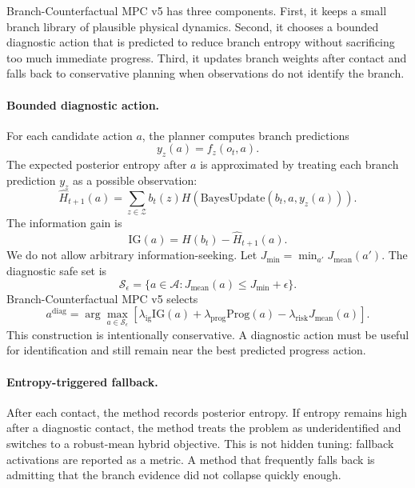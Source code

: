 \documentclass{article}
\newcommand{\methodv}{Branch-Counterfactual MPC v5}
\newcommand{\latent}{z}
\newcommand{\obs}{o}
\newcommand{\act}{a}
\newcommand{\branchset}{\mathcal{Z}}
\newcommand{\actionset}{\mathcal{A}}
\begin{document}
\methodv{} has three components.  First, it keeps a small branch library of plausible physical dynamics.  Second, it chooses a bounded diagnostic action that is predicted to reduce branch entropy without sacrificing too much immediate progress.  Third, it updates branch weights after contact and falls back to conservative planning when observations do not identify the branch.

\paragraph{Bounded diagnostic action.}
For each candidate action $\act$, the planner computes branch predictions
\[
  y_{\latent}(\act) = f_{\latent}(\obs_t,\act).
\]
The expected posterior entropy after $\act$ is approximated by treating each branch prediction $y_{\latent}$ as a possible observation:
\[
  \widehat{H}_{t+1}(\act)
  =
  \sum_{\latent \in \branchset} b_t(\latent)
  H\left(
  \mathrm{BayesUpdate}(b_t,\act,y_{\latent}(\act))
  \right).
\]
The information gain is
\[
  \mathrm{IG}(\act) = H(b_t)-\widehat{H}_{t+1}(\act).
\]
We do not allow arbitrary information-seeking.  Let $J_{\min}=\min_{\act'}J_{\mathrm{mean}}(\act')$.  The diagnostic safe set is
\[
  \mathcal{S}_{\epsilon}
  =
  \{\act \in \actionset: J_{\mathrm{mean}}(\act) \le J_{\min}+\epsilon\}.
\]
\methodv{} selects
\[
  \act^{\mathrm{diag}}
  =
  \arg\max_{\act \in \mathcal{S}_{\epsilon}}
  \left[
    \lambda_{\mathrm{ig}}\mathrm{IG}(\act)
    +\lambda_{\mathrm{prog}}\mathrm{Prog}(\act)
    -\lambda_{\mathrm{risk}}J_{\mathrm{mean}}(\act)
  \right].
\]
This construction is intentionally conservative.  A diagnostic action must be useful for identification and still remain near the best predicted progress action.

\paragraph{Entropy-triggered fallback.}
After each contact, the method records posterior entropy.  If entropy remains high after a diagnostic contact, the method treats the problem as underidentified and switches to a robust-mean hybrid objective.  This is not hidden tuning: fallback activations are reported as a metric.  A method that frequently falls back is admitting that the branch evidence did not collapse quickly enough.
\end{document}
